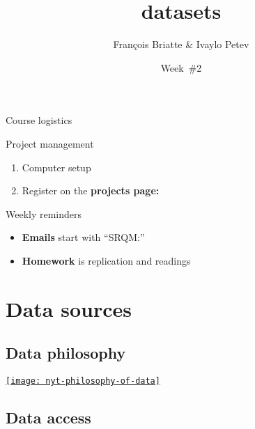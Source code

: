 \documentclass[t]{beamer}
\title{datasets}
\author{François Briatte \& Ivaylo Petev}
\date{Week~\#2}
\begin{document}

	\begin{frame}[t]{Course logistics}

    \begin{block}{Project management}
      \begin{enumerate}
        \item Computer setup
        \item Register on the \textbf{projects page:}
      \end{enumerate}
    \end{block}

    \begin{alertblock}{Weekly reminders}
      \begin{itemize}
	       \item \textbf{Emails} start with ``SRQM:''
	       \item \textbf{Homework} is replication and readings
      \end{itemize}
    \end{alertblock}
    		
	\end{frame}
  
  \section{Data sources}

  \subsection{Data philosophy}
  
  \begin{frame}[c, plain]
  
		\href{http://nyti.ms/XSZMFX}%
			{\texttt{[image: nyt-philosophy-of-data]}}	

  \end{frame}    

  \subsection{Data access}
	
\end{document}
